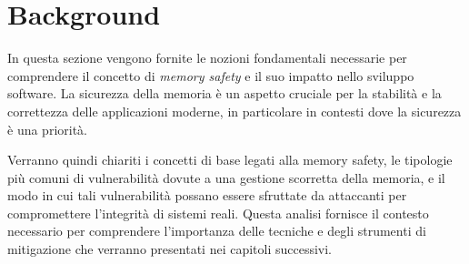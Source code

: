 \chapter{Background}
\label{cha:background}

In questa sezione vengono fornite le nozioni fondamentali necessarie per
comprendere il concetto di \textit{memory safety} e il suo impatto nello sviluppo
software. La sicurezza della memoria è un aspetto cruciale per la stabilità e la
correttezza delle applicazioni moderne, in particolare in contesti dove la sicurezza
è una priorità.

Verranno quindi chiariti i concetti di base legati alla memory safety, le
tipologie più comuni di vulnerabilità dovute a una gestione scorretta della
memoria, e il modo in cui tali vulnerabilità possano essere sfruttate da attaccanti
per compromettere l'integrità di sistemi reali. Questa analisi fornisce il
contesto necessario per comprendere l'importanza delle tecniche e degli
strumenti di mitigazione che verranno presentati nei capitoli successivi.





